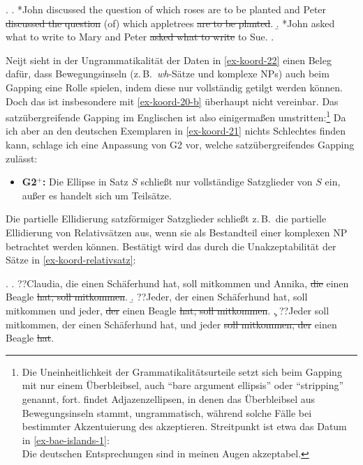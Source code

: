 \ex. \label{ex-koord-22}
\a. *John discussed the question of which roses are to be planted and Peter \sout{discussed the question} (of) which appletrees \sout{are to be planted}.\label{ex-koord-22-a}
\b. *John asked what to write to Mary and Peter \sout{asked what to write} to Sue.\label{ex-koord-22-b}
\z. \cite[153]{Neijt:79}  

Neijt sieht in der Ungrammatikalität der Daten in \ref{ex-koord-22} einen Beleg dafür, dass Bewegungsinseln (z.\,B.\  \textit{wh}-Sätze und komplexe NPs) auch beim Gapping eine Rolle spielen, indem diese nur vollständig getilgt werden können. Doch das ist insbesondere mit \ref{ex-koord-20-b} überhaupt nicht vereinbar. Das satzübergreifende Gapping  im Englischen ist also einigerma\ss en umstritten:\footnote{Die Uneinheitlichkeit der Grammatikalitätsurteile setzt sich beim Gapping mit nur einem Überbleibsel, auch "`bare argument ellipsis"' oder "`stripping"' genannt, fort. \citet[688f]{Merchant:04} findet Adjazenzellipsen, in denen das Überbleibsel aus Bewegungsinseln stammt, ungrammatisch, während  \citet[244f]{Culicover:Jackendoff:05} solche Fälle bei bestimmter Akzentuierung des  akzeptieren. Streitpunkt ist etwa das Datum in \ref{ex-bae-islands-1}:\\
Die deutschen Entsprechungen sind in meinen Augen akzeptabel.} Da ich aber an den deutschen Exemplaren in \ref{ex-koord-21} nichts Schlechtes finden kann, schlage ich eine Anpassung von G2 vor, welche satzübergreifendes Gapping zulässt: 
\begin{itemize}
  \item[] {\bf G2$^+$:} Die Ellipse in Satz $S$ schlie\ss t nur vollständige Satzglieder von $S$ ein, au\ss er es handelt sich um Teilsätze.
\end{itemize}
Die partielle Ellidierung satzförmiger Satzglieder schlie\ss t z.\,B.\  die partielle Ellidierung von Relativsätzen aus, wenn sie als Bestandteil einer komplexen NP betrachtet werden können. Bestätigt wird das durch die Unakzeptabilität der Sätze in \ref{ex-koord-relativsatz}:

\ex. \label{ex-koord-relativsatz}
\a. ??Claudia, die einen Schäferhund hat, soll mitkommen und Annika, \sout{die} einen Beagle \sout{hat, soll mitkommen}.
\b. ??Jeder, der einen Schäferhund hat, soll mitkommen und jeder, \sout{der} einen Beagle \sout{hat, soll mitkommen}.
\c. ??Jeder soll mitkommen, der einen Schäferhund hat, und jeder \sout{soll mitkommen, der} einen Beagle \sout{hat}.\label{ex-koord-relativsatz-c}

